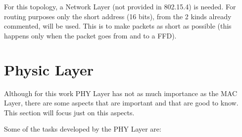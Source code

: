 For this topology, a Network Layer (not provided in 802.15.4) is needed. For routing purposes only the short address (16 bits),
from the 2 kinds already commented, will be used. This is to make packets as short as possible (this happens only when the packet goes from and 
to a \ac{FFD}).

\section{Physic Layer}

Although for this work \ac{PHY} Layer has not as much importance as the \ac{MAC} Layer, there are some aspects that are important and 
that are good to know. This section will focus just on this aspects.

Some of the tasks developed by the \ac{PHY} Layer are:

